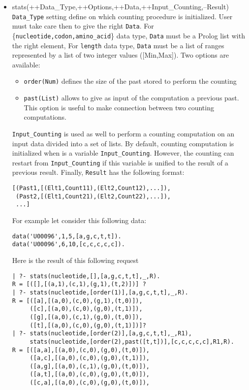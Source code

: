 \documentclass{book}
\begin{document}
\begin{itemize}
\item stats(++Data\_Type,++Options,++Data,++Input\_Counting,--Result) \\
\texttt{Data\_Type} setting define on which counting procedure is initialized. User must take care then
to give the right \texttt{Data}. For \{\texttt{nucleotide,codon,amino\_acid}\} data type, 
\texttt{Data} must be a Prolog list with the right element, For \texttt{length} data type,
\texttt{Data} must be a list of ranges represented by a list of two integer values ([Min,Max]).
Two options are available:
\begin{itemize}
\item \texttt{order(Num)} defines the size of the past stored to perform the counting
\item \texttt{past(List)} allows to give as input of the computation a previous past. This option is
useful to make connection between two counting computations.
\end{itemize}
\texttt{Input\_Counting} is used as well to perform a counting computation on an input data divided
into a set of lists. By default, counting computation is initialized when is a variable \texttt{Input\_Counting}.
However, the counting can restart from \texttt{Input\_Counting} if this variable is unified to
the result of a previous result. Finally, \texttt{Result} has the following format:
\begin{verbatim}
[(Past1,[(Elt1,Count11),(Elt2,Count12),...]), 
 (Past2,[(Elt1,Count21),(Elt2,Count22),...]),
 ...]
\end{verbatim}
For example let consider this following data:
\begin{verbatim}
data('U00096',1,5,[a,g,c,t,t]).
data('U00096',6,10,[c,c,c,c,c]).
\end{verbatim}
Here is the result of this following request
\begin{verbatim}
| ?- stats(nucleotide,[],[a,g,c,t,t],_,R).
R = [([],[(a,1),(c,1),(g,1),(t,2)])] ?
| ?- stats(nucleotide,[order(1)],[a,g,c,t,t],_,R).
R = [([a],[(a,0),(c,0),(g,1),(t,0)]),
     ([c],[(a,0),(c,0),(g,0),(t,1)]),
     ([g],[(a,0),(c,1),(g,0),(t,0)]),
     ([t],[(a,0),(c,0),(g,0),(t,1)])]?
| ?- stats(nucleotide,[order(2)],[a,g,c,t,t],_,R1),
     stats(nucleotide,[order(2),past([t,t])],[c,c,c,c,c],R1,R).
R = [([a,a],[(a,0),(c,0),(g,0),(t,0)]),
     ([a,c],[(a,0),(c,0),(g,0),(t,1)]),
     ([a,g],[(a,0),(c,1),(g,0),(t,0)]),
     ([a,t],[(a,0),(c,0),(g,0),(t,0)]),
     ([c,a],[(a,0),(c,0),(g,0),(t,0)]),

\end{verbatim}
\end{itemize}
\end{document}
